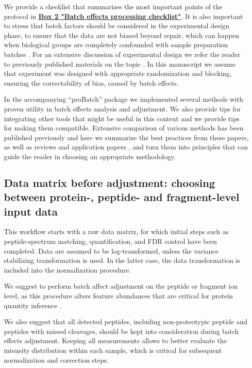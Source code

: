 \documentclass[num-refs]{wiley-article}
\begin{document}
We provide a checklist that summarizes the most important points of the protocol in \textbf{\hyperref[box:Box2_checklist]{Box 2 "Batch effects processing checklist"}}.
It is also important to stress that batch factors should be considered in the experimental design phase, to ensure that the data are not biased beyond repair, which can happen when biological groups are completely confounded with sample preparation batches  \cite{Hu2005, Gilad2015}. For an extensive discussion of experimental design we refer the reader to previously published materials on the topic \cite{Oberg2009, Cuklina2020}. In this manuscript we assume that experiment was designed with appropriate randomization and blocking, ensuring the correctability of bias, caused by batch effects.

In the accompanying “proBatch” package we implemented several methods with proven utility in batch effects analysis and adjustment. We also provide tips for integrating other tools that might be useful in this context and we provide tips for making them compatible. Extensive comparison of various methods has been published previously \cite{Chawade:2014aa, Luo2010} and here we summarize the best practices from these papers, as well as reviews \cite{Lazar:2013aa, Leek:2010aa}  and application papers \cite{Sajic2018, Collins2017}, and turn them into principles that can guide the reader in choosing an appropriate methodology. 

\subsection{Data matrix before adjustment: choosing between protein-, peptide- and fragment-level input data}
This workflow starts with a raw data matrix, for which initial steps such as peptide-spectrum matching, quantification, and FDR control have been completed. Data are assumed to be log-transformed, unless the variance stabilizing transformation \cite{Durbin2002} is used. In the latter case, the data transformation is included into the normalization procedure. 

We suggest to perform batch affect adjustment on the peptide or fragment ion level, as this procedure alters feature abundances that are critical for protein quantity inference \cite{Clough:2012aa, Teo:2015aa}.  

We also suggest that all detected peptides, including non-proteotypic peptide and peptides with missed cleavages, should be kept into consideration during batch effects adjustment. Keeping all measurements allows to better evaluate the intensity distribution within each sample, which is critical for subsequent normalization and correction steps.
\end{document}

